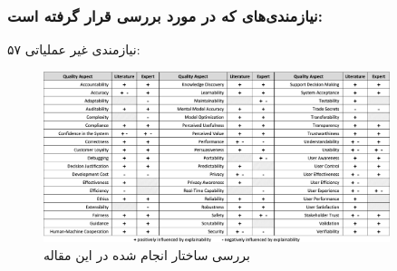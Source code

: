 \documentclass[10pt, a4paper]{beamer}
\begin{document}
\begin{frame}
    \frametitle{نیازمندی‌های  که در  مورد بررسی قرار گرفته است:}
    ۵۷ نیازمندی غیر عملیاتی:

    \begin{figure}[H]
        \centering
    \includegraphics[width=0.9\textwidth]{images/knowledge_catalogue.png}
        \caption{بررسی ساختار  انجام شده در این مقاله}
        \label{fig:slrOrder}
    \end{figure}
\end{frame}
\end{document}
